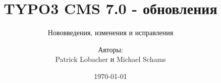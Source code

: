%

%
%

\documentclass[t]{beamer}

\beamertemplatenavigationsymbolsempty

{
	\usetheme{typo3slides}
}

\title{TYPO3 CMS 7.0 - обновления}
\subtitle{Нововведения, изменения и исправления}
\author{
	\centerline{Авторы:}
	\centerline{Patrick Lobacher и Michael Schams}
}

\date{\today}



\sharefont


\begingroup
	[default]
	\begin{frame}
		\titlepage
	\end{frame}
\endgroup



\section*{TYPO3 CMS 7.0 - обновления}
\begin{frame}[fragile]
	\frametitle{Обзор глав}
	\framesubtitle{Обзор глав}

	\begin{multicols}{2}
		\tableofcontents
	\end{multicols}

\end{frame}

